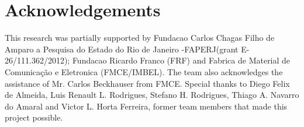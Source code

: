 \section*{Acknowledgements}
This research was partially supported by Fundacao Carlos Chagas Filho de Amparo a Pesquisa do Estado do Rio de Janeiro -FAPERJ(grant E-26/111.362/2012);
Fundacao Ricardo Franco (FRF) and Fabrica de Material de Comunicação e Eletronica (FMCE/IMBEL). The team also acknowledges the assistance of Mr. Carlos
Beckhauser from FMCE. Special thanks to Diego Felix de Almeida, Luis Renault L. Rodrigues, Stefano H. Rodrigues, Thiago A. Navarro do Amaral and Victor L. Horta Ferreira,
former team members that made this project possible.
